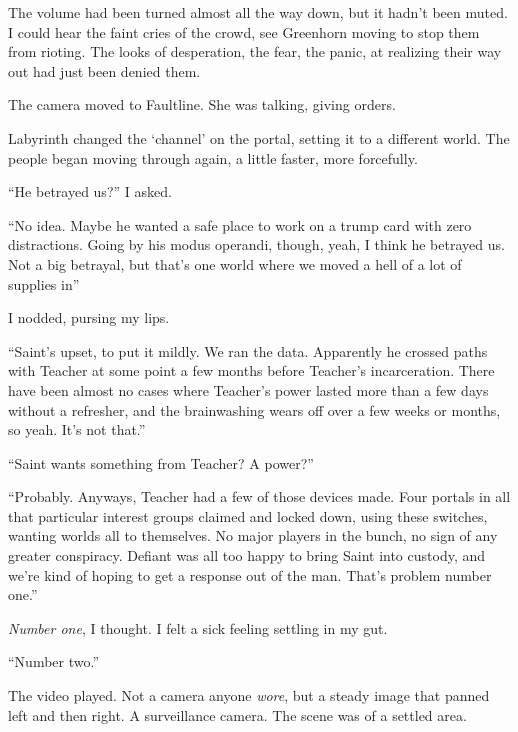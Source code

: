 The volume had been turned almost all the way down, but it hadn't been muted.  I could hear the faint cries of the crowd, see Greenhorn moving to stop them from rioting.  The looks of desperation, the fear, the panic, at realizing their way out had just been denied them.



The camera moved to Faultline.  She was talking, giving orders.



Labyrinth changed the `channel' on the portal, setting it to a different world.  The people began moving through again, a little faster, more forcefully.



``He betrayed us?'' I asked.



``No idea.  Maybe he wanted a safe place to work on a trump card with zero distractions.  Going by his modus operandi, though, yeah, I think he betrayed us.  Not a big betrayal, but that's one world where we moved a hell of a lot of supplies in''



I nodded, pursing my lips.



``Saint's upset, to put it mildly.  We ran the data.  Apparently he crossed paths with Teacher at some point a few months before Teacher's incarceration.  There have been almost no cases where Teacher's power lasted more than a few days without a refresher, and the brainwashing wears off over a few weeks or months, so yeah.  It's not that.''



``Saint wants something from Teacher?  A power?''



``Probably.  Anyways, Teacher had a few of those devices made.  Four portals in all that particular interest groups claimed and locked down, using these switches, wanting worlds all to themselves.  No major players in the bunch, no sign of any greater conspiracy.  Defiant was all too happy to bring Saint into custody, and we're kind of hoping to get a response out of the man.  That's problem number one.''



\emph{Number one}, I thought.  I felt a sick feeling settling in my gut.



``Number two.''



The video played.  Not a camera anyone \emph{wore}, but a steady image that panned left and then right.  A surveillance camera.  The scene was of a settled area.



